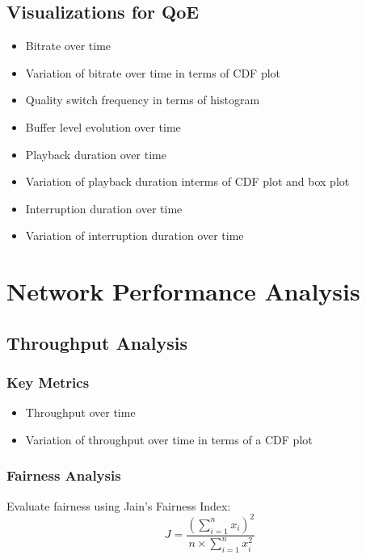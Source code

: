 \documentclass[11pt,a4paper]{article}
\begin{document}
\subsection{Visualizations for QoE}
\begin{itemize}
    \item Bitrate over time
    \item Variation of bitrate over time in terms of CDF plot
    \item Quality switch frequency in terms of histogram
    \item Buffer level evolution over time
    \item Playback duration over time
    \item Variation of playback duration interms of CDF plot and box plot
    \item Interruption duration over time
    \item Variation of interruption duration over time
\end{itemize}

\section{Network Performance Analysis}

\subsection{Throughput Analysis}

\subsubsection{Key Metrics}
\begin{itemize}
    \item Throughput over time
    \item Variation of throughput over time in terms of a CDF plot

\end{itemize}

\subsubsection{Fairness Analysis}

Evaluate fairness using Jain's Fairness Index:
\begin{equation}
    J = \frac{\left(\sum_{i=1}^{n} x_i\right)^2}{n \times \sum_{i=1}^{n} x_i^2}
\end{equation}
\end{document}

